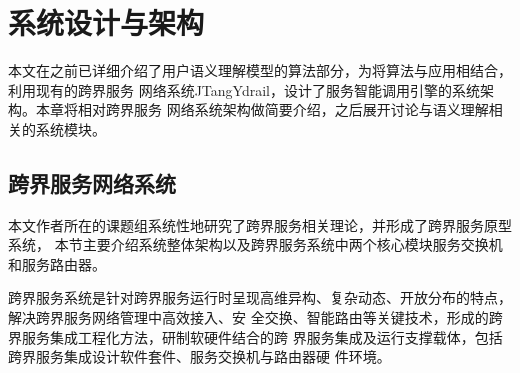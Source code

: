 \chapter{系统设计与架构}
本文在之前已详细介绍了用户语义理解模型的算法部分，为将算法与应用相结合，利用现有的跨界服务
网络系统JTangYdrail，设计了服务智能调用引擎的系统架构。本章将相对跨界服务
网络系统架构做简要介绍，之后展开讨论与语义理解相关的系统模块。

\section{跨界服务网络系统}
本文作者所在的课题组系统性地研究了跨界服务相关理论，并形成了跨界服务原型系统，
本节主要介绍系统整体架构以及跨界服务系统中两个核心模块服务交换机和服务路由器\cite{zheng2020service}。

  跨界服务系统是针对跨界服务运行时呈现高维异构、复杂动态、开放分布的特点，解决跨界服务网络管理中高效接入、安
  全交换、智能路由等关键技术，形成的跨界服务集成工程化方法，研制软硬件结合的跨
  界服务集成及运行支撑载体，包括跨界服务集成设计软件套件、服务交换机与路由器硬
  件环境。

